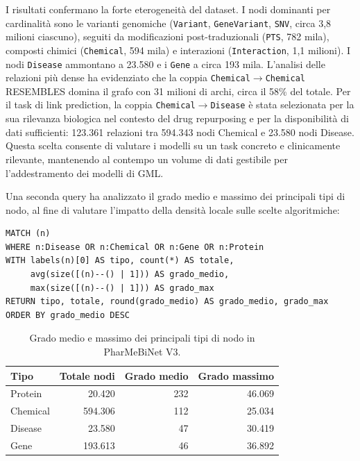 I risultati confermano la forte eterogeneità del dataset. I nodi dominanti per cardinalità sono le varianti genomiche (\texttt{Variant}, \texttt{GeneVariant}, \texttt{SNV}, circa 3,8 milioni ciascuno), seguiti da modificazioni post-traduzionali (\texttt{PTS}, 782 mila), composti chimici (\texttt{Chemical}, 594 mila) e interazioni (\texttt{Interaction}, 1,1 milioni). I nodi \texttt{Disease} ammontano a 23.580 e i \texttt{Gene} a circa 193 mila. L'analisi delle relazioni più dense ha evidenziato che la coppia \texttt{Chemical}$\to$\texttt{Chemical} RESEMBLES domina il grafo con 31 milioni di archi, circa il 58\% del totale. Per il task di link prediction, la coppia \texttt{Chemical}$\to$\texttt{Disease} è stata selezionata per la sua rilevanza biologica nel contesto del drug repurposing e per la disponibilità di dati sufficienti: 123.361 relazioni tra 594.343 nodi Chemical e 23.580 nodi Disease. Questa scelta consente di valutare i modelli su un task concreto e clinicamente rilevante, mantenendo al contempo un volume di dati gestibile per l'addestramento dei modelli di GML.

Una seconda query ha analizzato il grado medio e massimo dei principali tipi di nodo, al fine di valutare l'impatto della densità locale sulle scelte algoritmiche:

\begin{lstlisting}[language=Cypher, caption={Query sul grado dei nodi principali}]
MATCH (n)
WHERE n:Disease OR n:Chemical OR n:Gene OR n:Protein
WITH labels(n)[0] AS tipo, count(*) AS totale,
     avg(size([(n)--() | 1])) AS grado_medio,
     max(size([(n)--() | 1])) AS grado_max
RETURN tipo, totale, round(grado_medio) AS grado_medio, grado_max
ORDER BY grado_medio DESC
\end{lstlisting}

\begin{table}[ht!]
\centering
\small
\begin{tabular}{lrrr}
\toprule
\textbf{Tipo} & \textbf{Totale nodi} & \textbf{Grado medio} & \textbf{Grado massimo} \\
\midrule
Protein  &  20.420 & 232 & 46.069 \\
Chemical & 594.306 & 112 & 25.034 \\
Disease  &  23.580 &  47 & 30.419 \\
Gene     & 193.613 &  46 & 36.892 \\
\bottomrule
\end{tabular}
\caption{Grado medio e massimo dei principali tipi di nodo in PharMeBiNet V3.}
\label{tab:node_degrees}
\end{table}

